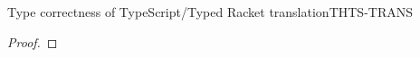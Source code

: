 \documentclass[acmlarge, anonymous, authordraft, review]{acmart} %
\begin{document}
\begin{lemma}{Type correctness of TypeScript/Typed Racket translation}{THTS-TRANS}
  \begin{proof} 
% 
%       
%     
% 
%     
%       

\end{proof}
\end{lemma}
\end{document}
